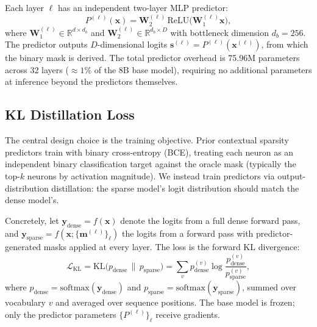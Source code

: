 Each layer $\ell$ has an independent two-layer MLP predictor:
\begin{equation}
P^{(\ell)}(\mathbf{x}) = \mathbf{W}_2^{(\ell)}\, \text{ReLU}\!\bigl(\mathbf{W}_1^{(\ell)} \mathbf{x}\bigr),
\label{eq:predictor}
\end{equation}
where $\mathbf{W}_1^{(\ell)} \in \mathbb{R}^{d \times d_b}$ and $\mathbf{W}_2^{(\ell)} \in \mathbb{R}^{d_b \times D}$ with bottleneck dimension $d_b{=}256$.
The predictor outputs $D$-dimensional logits $\mathbf{s}^{(\ell)} = P^{(\ell)}(\mathbf{x}^{(\ell)})$, from which the binary mask is derived.
The total predictor overhead is 75.96M parameters across 32 layers (${\approx}1\%$ of the 8B base model), requiring no additional parameters at inference beyond the predictors themselves.

\subsection{KL Distillation Loss}
\label{sec:method:kl}

The central design choice is the training objective.
Prior contextual sparsity predictors \cite{placeholder_dejavu,placeholder_shadowllm,placeholder_fastforward} train with binary cross-entropy (BCE), treating each neuron as an independent binary classification target against the oracle mask (typically the top-$k$ neurons by activation magnitude).
We instead train predictors via output-distribution distillation: the sparse model's logit distribution should match the dense model's.

Concretely, let $\mathbf{y}_{\text{dense}} = f(\mathbf{x})$ denote the logits from a full dense forward pass, and $\mathbf{y}_{\text{sparse}} = f(\mathbf{x}; \{\mathbf{m}^{(\ell)}\}_\ell)$ the logits from a forward pass with predictor-generated masks applied at every layer.
The loss is the forward KL divergence:
\begin{equation}
\mathcal{L}_{\text{KL}} = \text{KL}\!\bigl(p_{\text{dense}} \,\|\, p_{\text{sparse}}\bigr) = \sum_{v} p_{\text{dense}}^{(v)} \log \frac{p_{\text{dense}}^{(v)}}{p_{\text{sparse}}^{(v)}},
\label{eq:kl_loss}
\end{equation}
where $p_{\text{dense}} = \text{softmax}(\mathbf{y}_{\text{dense}})$ and $p_{\text{sparse}} = \text{softmax}(\mathbf{y}_{\text{sparse}})$, summed over vocabulary $v$ and averaged over sequence positions.
The base model is frozen; only the predictor parameters $\{P^{(\ell)}\}_\ell$ receive gradients.

